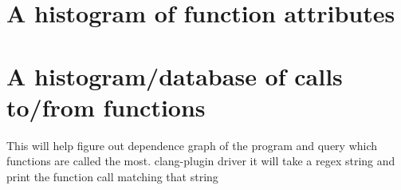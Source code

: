 \section{A histogram of function attributes}
\section{A histogram/database of calls to/from functions}
This will help figure out dependence graph of the program and query which functions are called the most.
clang-plugin driver
 it will take a regex string and print the function call matching that string
